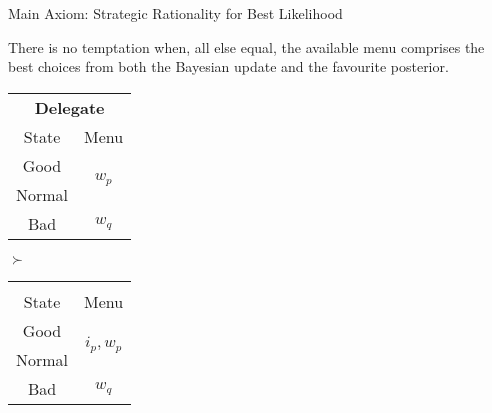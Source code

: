 \documentclass[usenames,dvipsnames,aspectratio=169,11pt, envcountsect, handout]{beamer}
\begin{document}
\begin{frame}[noframenumbering]{Main Axiom: Strategic Rationality for Best Likelihood}

	\begin{axiom}
		There is no temptation when, all else equal, the available menu comprises the best choices from both the Bayesian update and the favourite posterior.
	\end{axiom}

	\vfill

	\begin{table}[H]
		\centering
		\begin{minipage}{0.4\textwidth}
			\centering
			\begin{tabular}{c | c}
				\multicolumn{2}{c}{\textbf{Delegate}}                           \\
				State                & Menu                                     \\
				\hline
				{\color{blue}Good}   & \multirow{2}{*}{{\color{blue}\( w_p \)}} \\
				{\color{blue}Normal} &                                          \\
				Bad                  & \( w_q \)                                \\
			\end{tabular}
			\vspace{0.5cm} %
		\end{minipage}%
		\( \succ \)
		\begin{minipage}{0.4\textwidth}
			\centering
			\begin{tabular}{c | c}
				\multicolumn{2}{c}{}                                                \\
				State                & Menu                                         \\
				\hline
				{\color{blue}Good}   & \multirow{2}{*}{{\color{blue}\(i_p, w_p \)}} \\
				{\color{blue}Normal} &                                              \\
				Bad                  & \( w_q \)                                    \\
			\end{tabular}
			\vspace{0.5cm} %
		\end{minipage} %
	\end{table}

	\begin{flushright}
		\hyperlink{srblapp}{}
	\end{flushright}

\end{frame}
\end{document}
